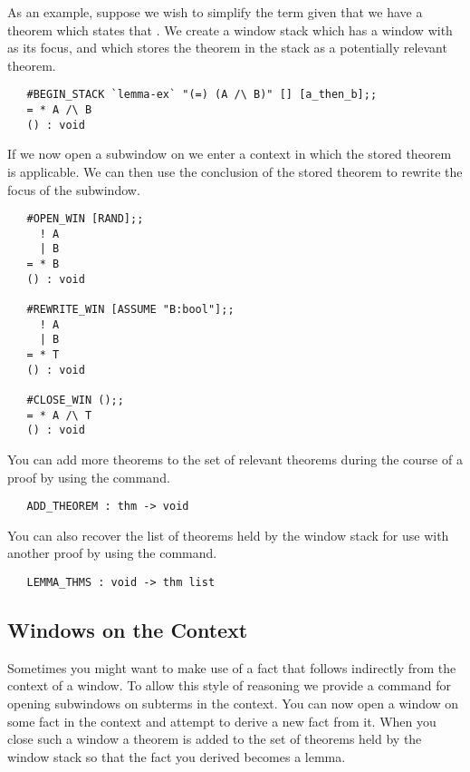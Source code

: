 As an example,
suppose we wish to simplify the term  given that we 
have a theorem  which states that .
We create a window stack which has a window with  as its
focus, and which stores the theorem  in the stack as a
potentially relevant theorem.
\setcounter{sessioncount}{1}
\begin{session}\begin{verbatim}
   #BEGIN_STACK `lemma-ex` "(=) (A /\ B)" [] [a_then_b];;
   = * A /\ B
   () : void
\end{verbatim}\end{session}
If we now open a subwindow on  we enter a context in which the
stored theorem is applicable.
We can then use the conclusion of the stored theorem to rewrite the focus
of the subwindow.
\begin{session}\begin{verbatim}
   #OPEN_WIN [RAND];;
     ! A
     | B
   = * B
   () : void
   
   #REWRITE_WIN [ASSUME "B:bool"];;
     ! A
     | B
   = * T
   () : void
   
   #CLOSE_WIN ();;
   = * A /\ T
   () : void
\end{verbatim}\end{session}

You can add more theorems to the set of relevant theorems during the course of
a proof by using the
 command.
\begin{boxed}\begin{verbatim}
   ADD_THEOREM : thm -> void
\end{verbatim}\end{boxed}
You can also recover the list of theorems held by the window stack for
use with another proof by using the
 command.
\begin{boxed}\begin{verbatim}
   LEMMA_THMS : void -> thm list
\end{verbatim}\end{boxed}

\subsection{Windows on the Context}

Sometimes you might want to make use of a fact that follows indirectly from
the context of a window.
To allow this style of reasoning we provide a command for opening subwindows
on subterms in the context.
You can now open a window on some fact in the context and attempt to 
derive a new fact from it.
When you close such a window a theorem is added to the set of theorems
held by the window stack so that the fact you derived becomes a lemma.

